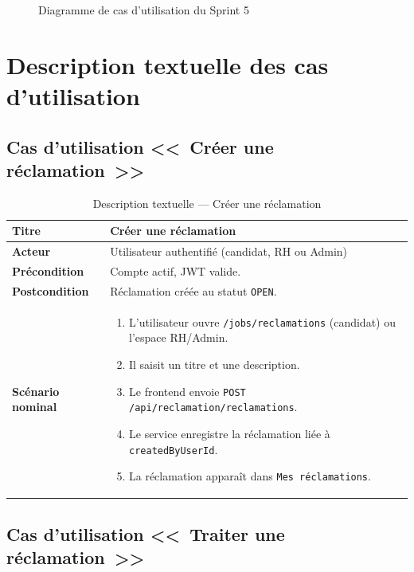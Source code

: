\begin{figure}[H]
  \centering
  \caption{Diagramme de cas d'utilisation du Sprint 5}
  \label{fig:uc-sprint5}
\end{figure}


\section{Description textuelle des cas d'utilisation}

\subsection{Cas d'utilisation <<~Créer une réclamation~>>}

\begin{table}[htbp]
  \centering
  \small
  \caption{Description textuelle --- Créer une réclamation}
  \label{tab:uc-create-reclamation}
  \begin{tabular}{|p{3.0cm}|p{10.2cm}|}
    \hline
    \textbf{Titre} & Créer une réclamation \\
    \hline
    \textbf{Acteur} & Utilisateur authentifié (candidat, RH ou Admin) \\
    \hline
    \textbf{Précondition} & Compte actif, JWT valide. \\
    \hline
    \textbf{Postcondition} & Réclamation créée au statut \texttt{OPEN}. \\
    \hline
    \textbf{Scénario nominal}
    &
    \begin{enumerate}[leftmargin=*,itemsep=0.15em,topsep=0.2em]
      \item L'utilisateur ouvre \texttt{/jobs/reclamations} (candidat)
            ou l'espace RH/Admin.
      \item Il saisit un titre et une description.
      \item Le frontend envoie \texttt{POST /api/reclamation/reclamations}.
      \item Le service enregistre la réclamation liée à
            \texttt{createdByUserId}.
      \item La réclamation apparaît dans \texttt{Mes réclamations}.
    \end{enumerate}
    \\
    \hline
  \end{tabular}
\end{table}


\subsection{Cas d'utilisation <<~Traiter une réclamation~>>}

